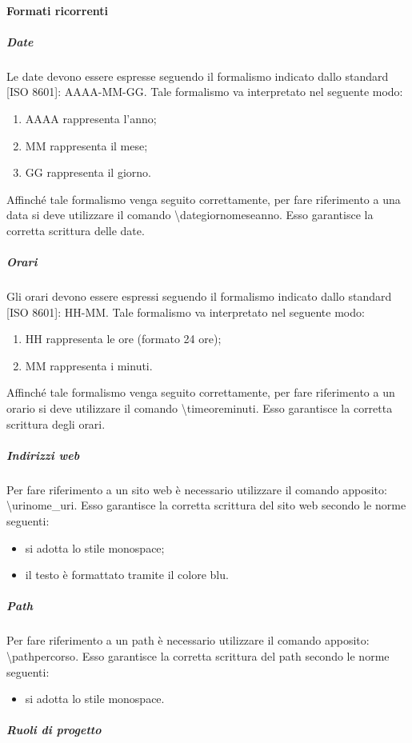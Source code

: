			\paragraph{Formati ricorrenti}
				\subparagraph{Date}
					Le date devono essere espresse seguendo il formalismo indicato dallo standard [ISO 8601]: AAAA-MM-GG. Tale formalismo va interpretato nel seguente modo:
					\begin{enumerate}
						\item AAAA rappresenta l’anno;
						\item MM rappresenta il mese;
						\item GG rappresenta il giorno.
					\end{enumerate}
					Affinché tale formalismo venga seguito correttamente, per fare riferimento a una data si deve utilizzare il comando \latex{} \textbackslash date{giorno}{mese}{anno}. Esso garantisce la corretta scrittura delle date.
				\subparagraph{Orari}
					Gli orari devono essere espressi seguendo il formalismo indicato dallo standard [ISO 8601]: HH-MM. Tale formalismo va interpretato nel seguente modo:
					\begin{enumerate}
						\item HH rappresenta le ore (formato 24 ore);
						\item MM rappresenta i minuti.
					\end{enumerate}
					Affinché tale formalismo venga seguito correttamente, per fare riferimento a un orario si deve utilizzare il comando \latex{} \textbackslash time{ore}{minuti}. Esso garantisce la corretta scrittura degli orari.
				\subparagraph{Indirizzi web}
					Per fare riferimento a un sito web è necessario utilizzare il comando \latex{} apposito: \textbackslash uri{nome_uri}. Esso garantisce la corretta scrittura del sito web secondo le norme seguenti:
					\begin{itemize}
						\item si adotta lo stile monospace;
						\item il testo è formattato tramite il colore blu.
					\end{itemize}
				\subparagraph{Path}
					Per fare riferimento a un path è necessario utilizzare il comando \latex{} apposito: \textbackslash path{percorso}. Esso garantisce la corretta scrittura del path secondo le norme seguenti:
					\begin{itemize}
						\item si adotta lo stile monospace.
					\end{itemize}
				\subparagraph{Ruoli di progetto}
